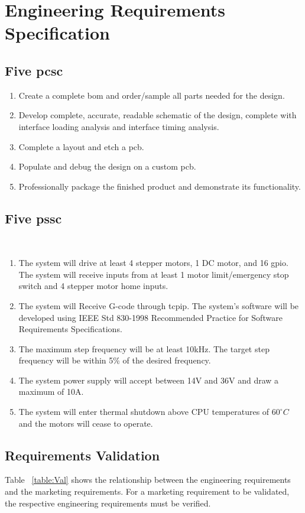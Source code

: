 \chapter{Engineering Requirements Specification}

\section{Five \gls{pcsc}}
\begin{enumerate}
	\item Create a complete \gls{bom} and order/sample all parts needed for the design.
	\item Develop complete, accurate, readable schematic of the design, complete with interface loading analysis and interface timing analysis. 
	\item Complete a layout and etch a \gls{pcb}.
	\item Populate and debug the design on a custom \gls{pcb}.
	\item Professionally package the finished product and demonstrate its functionality.
\end{enumerate}

\section{Five \gls{pssc}}\
\begin{enumerate}
	\item The system will drive at least 4 stepper motors, 1 DC motor, and 16 \gls{gpio}.
The system will receive inputs from at least 1 motor limit/emergency stop switch and 4 stepper motor home inputs.
	\item The system will Receive G-code through \gls{tcpip}.
The system’s software will be developed using IEEE Std 830-1998 Recommended Practice for Software Requirements Specifications.
	\item The maximum step frequency will be at least 10kHz.
The target step frequency will be within 5\% of the desired frequency.
	\item The system power supply will accept between 14V and 36V and draw a maximum of 10A.
	\item The system will enter thermal shutdown above CPU temperatures of $60^{\circ}C$ and the motors will cease to operate.
\end{enumerate}

\section{Requirements Validation}
Table ~\ref{table:Val} shows the relationship between the engineering requirements and the marketing requirements.
For a marketing requirement to be validated, the respective engineering requirements must be verified.

